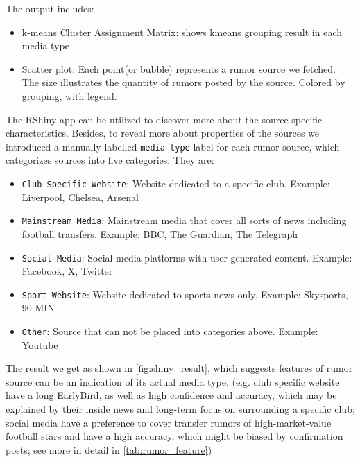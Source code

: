 The output includes:
\begin{itemize}
    \item k-means Cluster Assignment Matrix: shows kmeans grouping result in each media type
    \item Scatter plot: Each point(or bubble) represents a rumor source we fetched. The size illustrates the quantity of rumors posted by the source. Colored by grouping, with legend.
\end{itemize}

The RShiny app can be utilized to discover more about the source-specific characteristics. Besides, to reveal more about properties of the sources we introduced a manually labelled \texttt{media type} label for each rumor source, which categorizes sources into five categories. They are:
\begin{itemize}
    \item \texttt{Club Specific Website}: Website dedicated to a specific club. Example: Liverpool, Chelsea, Arsenal
    \item \texttt{Mainstream Media}: Mainstream media that cover all sorts of news including football transfers. Example: BBC, The Guardian, The Telegraph 
    \item \texttt{Social Media}: Social media platforms with user generated content. Example: Facebook, X, Twitter
    \item \texttt{Sport Website}: Website dedicated to sports news only. Example: Skysports, 90 MIN
    \item \texttt{Other}: Source that can not be placed into categories above. Example: Youtube
\end{itemize}

The result we get as shown in \autoref{fig:shiny_result}, which suggests features of rumor source can be an indication of its actual media type. (e.g. club specific website have a long EarlyBird, as well as high confidence and accuracy, which may be explained by their inside news and long-term focus on surrounding a specific club; social media have a preference to cover transfer rumors of high-market-value football stars and have a high accuracy, which might be biased by confirmation posts; see more in detail in \autoref{tab:rumor_feature})

